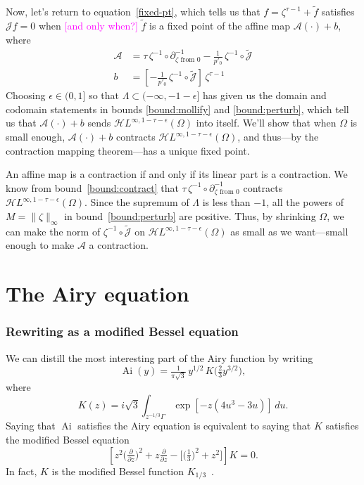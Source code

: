 \documentclass{article}
\newcommand{\holoL}[1]{\mathcal{H}L^{#1}} %
\DeclareMathOperator{\Ai}{Ai}
\begin{document}
Now, let's return to equation~\ref{fixed-pt}, which tells us that $f = \zeta^{\tau-1} + \tilde{f}$ satisfies $\mathcal{J}f = 0$ when \textcolor{magenta}{[and only when?]} $\tilde{f}$ is a fixed point of the affine map $\mathcal{A}(\cdot) + b$, where
\begin{align*}
\mathcal{A} & = \tau\,\zeta^{-1} \circ \partial^{-1}_{\zeta \text{ from } 0} - \tfrac{1}{p'_0}\,\zeta^{-1} \circ \tilde{\mathcal{J}}  \\
b & = \left[ -\tfrac{1}{p'_0}\,\zeta^{-1} \circ \tilde{\mathcal{J}} \right]\,\zeta^{\tau-1}
\end{align*}
Choosing $\epsilon \in (0, 1]$ so that $\Lambda \subset (-\infty, -1 - \epsilon]$ has given us the domain and codomain statements in bounds \ref{bound:mollify} and \ref{bound:perturb}, which tell us that $\mathcal{A}(\cdot) + b$ sends $\holoL{\infty, 1-\tau-\epsilon}(\Omega)$ into itself. We'll show that when $\Omega$ is small enough, $\mathcal{A}(\cdot) + b$ contracts $\holoL{\infty, 1-\tau-\epsilon}(\Omega)$, and thus---by the contraction mapping theorem---has a unique fixed point.

An affine map is a contraction if and only if its linear part is a contraction. We know from bound~\ref{bound:contract} that $\tau\,\zeta^{-1} \circ \partial^{-1}_{\zeta \text{ from } 0}$ contracts $\holoL{\infty, 1-\tau-\epsilon}(\Omega)$. Since the supremum of $\Lambda$ is less than $-1$, all the powers of $M = \|\zeta\|_\infty$ in bound~\ref{bound:perturb} are positive. Thus, by shrinking $\Omega$, we can make the norm of $\zeta^{-1} \circ \tilde{\mathcal{J}}$ on $\holoL{\infty, 1-\tau-\epsilon}(\Omega)$ as small as we want---small enough to make $\mathcal{A}$ a contraction.
%

\section{The Airy equation}\label{airy-appendix}

\subsubsection{Rewriting as a modified Bessel equation}
We can distill the most interesting part of the Airy function by writing
\[ \Ai(y) = \tfrac{1}{\pi\sqrt{3}}\,y^{1/2}\,K\big(\tfrac{2}{3} y^{3/2}\big), \]
where
\begin{equation}\label{integral:mod-bessel}
K(z) = i\sqrt{3} \int_{z^{-1/3}\Gamma} \exp\left[-z \left(4u^3 - 3u\right)\right]\,du.
\end{equation}
Saying that $\Ai$ satisfies the Airy equation is equivalent to saying that $K$ satisfies the modified Bessel equation
\begin{equation}\label{eqn:mod-bessel}
\left[z^2 \big(\tfrac{\partial}{\partial z}\big)^2 + z \tfrac{\partial}{\partial z} - \big[\big(\tfrac{1}{3}\big)^2 + z^2\big]\right] K = 0.
\end{equation}
In fact, $K$ is the modified Bessel function $K_{1/3}$~\cite[equation~9.6.1]{dlmf}.
\end{document}
